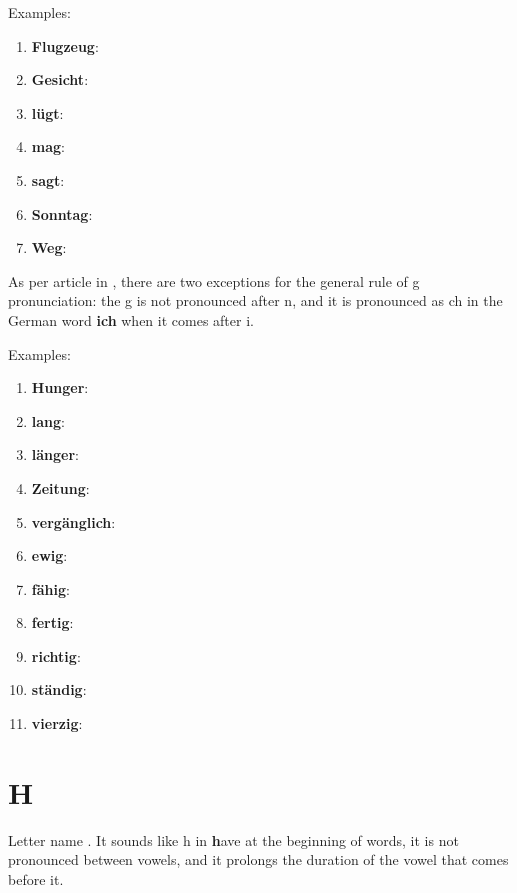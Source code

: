 Examples:
\begin{enumerate}
    \item \textbf{Flugzeug}: 
    \item \textbf{Gesicht}: \textipa{[g@"zI\c{c}t]}
    \item \textbf{lügt}: \textipa{[ly:kt]}
    \item \textbf{mag}: \textipa{[ma:k]}
    \item \textbf{sagt}: \textipa{[za:kt]}
    \item \textbf{Sonntag}: \textipa{["zOnta:k]}
    \item \textbf{Weg}: \textipa{[ve:k]}
\end{enumerate}

As per article in \cite{duden2025}, there are two exceptions for the general rule of g pronunciation: the g is not pronounced after n, and it is pronounced as ch in the German word \textbf{ich} when it comes after i.

Examples:
\begin{enumerate}
    \item \textbf{Hunger}: \textipa{["hUN@r]}
    \item \textbf{lang}: \textipa{[laN]}
    \item \textbf{länger}: \textipa{["lEN@r]}
    \item \textbf{Zeitung}: \textipa{["tsaItUN]}
    \item \textbf{vergänglich}: 
    \item \textbf{ewig}: \textipa{["e:vI\c{c}]}
    \item \textbf{fähig}: \textipa{["fE:I\c{c}]}
    \item \textbf{fertig}: \textipa{["fErtI\c{c}]}
    \item \textbf{richtig}: \textipa{["ri\c{c}tI\c{c}]}
    \item \textbf{ständig}: \textipa{["StEndI\c{c}]}
    \item \textbf{vierzig}: \textipa{["fi:rtsI\c{c}]}
\end{enumerate}

\section*{H}

Letter name \textipa{[ha:]}. It sounds like h in \textbf{h}ave at the beginning of words, it is not pronounced between vowels, and it prolongs the duration of the vowel that comes before it.

